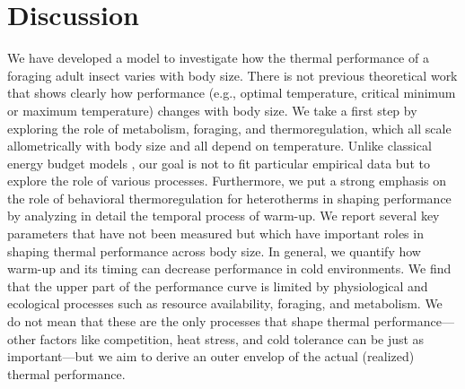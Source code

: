 \section*{Discussion}
We have developed a model to investigate how the thermal performance of a foraging adult insect varies with body size.
There is not previous theoretical work that shows clearly how performance (e.g., optimal temperature, critical minimum or maximum temperature) changes with body size. 
We take a first step by exploring the role of metabolism, foraging, and thermoregulation, which all scale allometrically with body size and all depend on temperature.
Unlike classical energy budget models \citep[e.g.,][]{Kooijman2009}, our goal is not to fit particular empirical data but to explore the role of various processes.
Furthermore, we put a strong emphasis on the role of behavioral thermoregulation for heterotherms in shaping performance by analyzing in detail the temporal process of warm-up.
We report several key parameters that have not been measured but which have important roles in shaping thermal performance across body size.
In general, we quantify how warm-up and its timing can decrease performance in cold environments.
We find that the upper part of the performance curve is limited by physiological and ecological processes such as resource availability, foraging, and metabolism. %
We do not mean that these are the only processes that shape thermal performance---other factors like competition, heat stress, and cold tolerance can be just as important---but we aim to derive an outer envelop of the actual (realized) thermal performance. %

